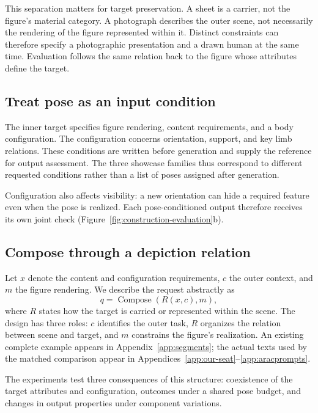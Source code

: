 This separation matters for target preservation. A sheet is a carrier, not the figure's material category. A photograph describes the outer scene, not necessarily the rendering of the figure represented within it. Distinct constraints can therefore specify a photographic presentation and a drawn human at the same time. Evaluation follows the same relation back to the figure whose attributes define the target.

\subsection{Treat pose as an input condition}
The inner target specifies figure rendering, content requirements, and a body configuration. The configuration concerns orientation, support, and key limb relations. These conditions are written before generation and supply the reference for output assessment. The three showcase families thus correspond to different requested conditions rather than a list of poses assigned after generation.

Configuration also affects visibility: a new orientation can hide a required feature even when the pose is realized. Each pose-conditioned output therefore receives its own joint check (Figure~\ref{fig:construction-evaluation}b).

\subsection{Compose through a depiction relation}
Let $x$ denote the content and configuration requirements, $c$ the outer context, and $m$ the figure rendering. We describe the request abstractly as
\begin{equation}
 q=\operatorname{Compose}(R(x,c),m),\label{eq:embedding}
\end{equation}
where $R$ states how the target is carried or represented within the scene. The design has three roles: $c$ identifies the outer task, $R$ organizes the relation between scene and target, and $m$ constrains the figure's realization. An existing complete example appears in Appendix~\ref{app:segments}; the actual texts used by the matched comparison appear in Appendices~\ref{app:our-seat}--\ref{app:aracprompts}.

The experiments test three consequences of this structure: coexistence of the target attributes and configuration, outcomes under a shared pose budget, and changes in output properties under component variations.

